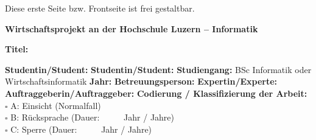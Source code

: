 {Diese erste Seite bzw. Frontseite ist frei gestaltbar.}
\newpage

\noindent
\fontsize{12}{14}
\textbf{Wirtschaftsprojekt an der Hochschule Luzern -- Informatik} \\ \vspace*{0.6cm}

\fontsize{10.5}{12}
\noindent
\textbf{Titel:} \\ \vspace*{0.2cm}

\noindent
\textbf{Studentin/Student:} \newline \newline
\textbf{Studentin/Student:} \newline \newline
\textbf{Studiengang:} BSc Informatik oder Wirtschaftsinformatik  \newline \newline
\textbf{Jahr:} \newline \newline
\textbf{Betreuungsperson:} \newline \newline
\textbf{Expertin/Experte:} \newline \newline
\textbf{Auftraggeberin/Auftraggeber:} \newline \newline \newline
\textbf{Codierung / Klassifizierung der Arbeit:}\\
$\square$ A: Einsicht 	(Normalfall) \\
$\square$ B: R\"ucksprache	(Dauer: \ \ \ \ \        Jahr / Jahre)\\
$\square$ C: Sperre	(Dauer: \ \ \ \ \        Jahr / Jahre)\\




